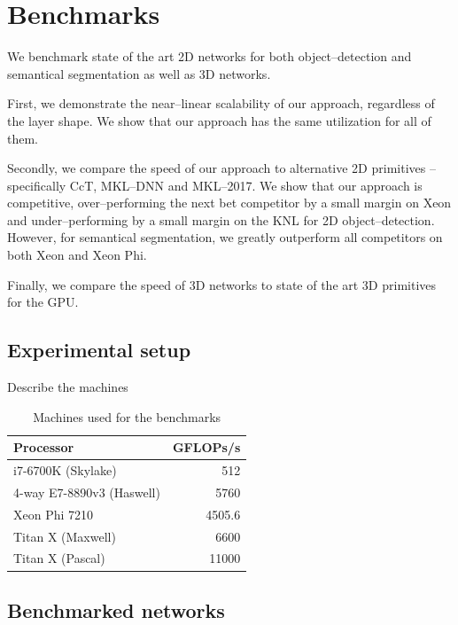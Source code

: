 \section{Benchmarks}

  We benchmark state of the art 2D networks for both object--detection
  and semantical segmentation as well as 3D networks.

  First, we demonstrate the near--linear scalability of our approach,
  regardless of the layer shape.  We show that our approach has the
  same utilization for all of them.

  Secondly, we compare the speed of our approach to alternative 2D
  primitives -- specifically CcT, MKL--DNN and MKL--2017.  We show
  that our approach is competitive, over--performing the next bet
  competitor by a small margin on Xeon and under--performing by a
  small margin on the KNL for 2D object--detection.  However, for
  semantical segmentation, we greatly outperform all competitors on
  both Xeon and Xeon Phi.

  Finally, we compare the speed of 3D networks to state of the art 3D
  primitives for the GPU.

  \subsection{Experimental setup}

  Describe the machines

  \begin{table}
    \begin{center}
      \begin{tabular}{lr}
        \hline
        Processor & GFLOPs/s\\
        \hline
        i7-6700K (Skylake) & 512\\
        4-way E7-8890v3 (Haswell) & 5760\\
        Xeon Phi 7210 & 4505.6\\
        Titan X (Maxwell) & 6600\\
        Titan X (Pascal) & 11000\\
        \hline
      \end{tabular}
    \end{center}
    \caption{Machines used for the benchmarks}
  \end{table}

  \subsection{Benchmarked networks}

